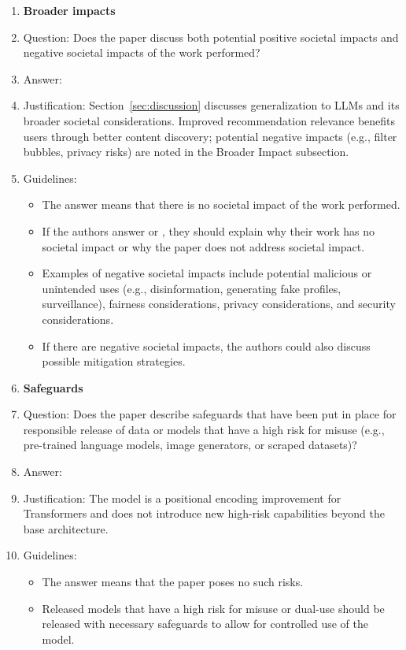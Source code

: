 \begin{enumerate}
\item {\bf Broader impacts}
    \item[] Question: Does the paper discuss both potential positive societal impacts and negative societal impacts of the work performed?
    \item[] Answer: \answerYes{}
    \item[] Justification: Section~\ref{sec:discussion} discusses generalization to LLMs and its broader societal considerations. Improved recommendation relevance benefits users through better content discovery; potential negative impacts (e.g., filter bubbles, privacy risks) are noted in the Broader Impact subsection.
    \item[] Guidelines:
    \begin{itemize}
        \item The answer \answerNA{} means that there is no societal impact of the work performed.
        \item If the authors answer \answerNA{} or \answerNo{}, they should explain why their work has no societal impact or why the paper does not address societal impact.
        \item Examples of negative societal impacts include potential malicious or unintended uses (e.g., disinformation, generating fake profiles, surveillance), fairness considerations, privacy considerations, and security considerations.
        \item If there are negative societal impacts, the authors could also discuss possible mitigation strategies.
    \end{itemize}

\item {\bf Safeguards}
    \item[] Question: Does the paper describe safeguards that have been put in place for responsible release of data or models that have a high risk for misuse (e.g., pre-trained language models, image generators, or scraped datasets)?
    \item[] Answer: \answerNA{}
    \item[] Justification: The model is a positional encoding improvement for Transformers and does not introduce new high-risk capabilities beyond the base architecture.
    \item[] Guidelines:
    \begin{itemize}
        \item The answer \answerNA{} means that the paper poses no such risks.
        \item Released models that have a high risk for misuse or dual-use should be released with necessary safeguards to allow for controlled use of the model.
    \end{itemize}


\end{enumerate}
